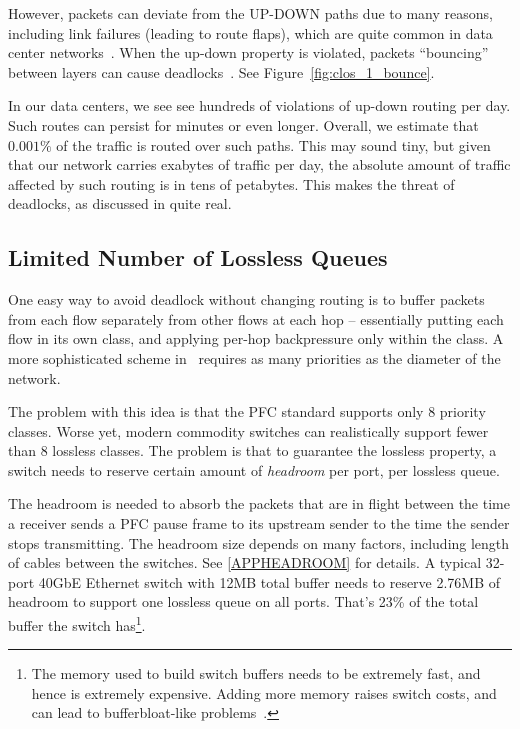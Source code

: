 However, packets can deviate from the UP-DOWN paths due to many reasons,
including link failures (leading to route flaps), which are quite common in data
center networks~\cite{netpilot,f10}. When the up-down property is violated,
packets ``bouncing'' between layers can cause
deadlocks~\cite{shpiner2016unlocking}. See
Figure~\ref{fig:clos_1_bounce}.

In our data centers, we see see hundreds of violations of up-down routing per
day. Such routes can persist for minutes or even longer. Overall, we estimate
that $0.001\%$ of the traffic is routed over such paths. This may sound tiny,
but given that our network carries exabytes of traffic per day, the absolute
amount of traffic affected by such routing is in tens of petabytes. This makes
the threat of deadlocks, as discussed
in\cite{rdmaatscale,shpiner2016unlocking,hu2016deadlocks} quite real.

\subsection{Limited Number of Lossless Queues}
\label{subsec:pfcheadroom}

One easy way to avoid deadlock without changing routing is to buffer packets
from each flow separately from other flows at each hop -- essentially putting
each flow in its own class, and applying per-hop backpressure only within the
class.  A more sophisticated scheme in~\cite{karol2003prevention} requires as
many priorities as the diameter of the network. 

The problem with this idea is that the PFC standard supports only 8 priority
classes. Worse yet, modern commodity switches can realistically support fewer
than 8 lossless classes.  The problem is that  to guarantee the lossless
property, a switch needs to reserve certain amount of {\it headroom} per port,
per lossless queue.

The headroom is needed to absorb the packets that are in flight between the time
a receiver sends a PFC pause frame to its upstream sender to the time the sender
stops transmitting.  The headroom size depends on many factors, including length
of cables between the switches. See \ref{APPHEADROOM} for details.  A typical
32-port 40GbE Ethernet switch with 12MB total buffer needs to reserve 2.76MB of
headroom to support one lossless queue on all ports. That's 23\% of the total
buffer the switch has\footnote{The memory used to build switch buffers needs to
be extremely fast, and hence is extremely expensive. Adding more memory raises
switch costs, and can lead to bufferbloat-like problems~\cite{dctcp}.}.


